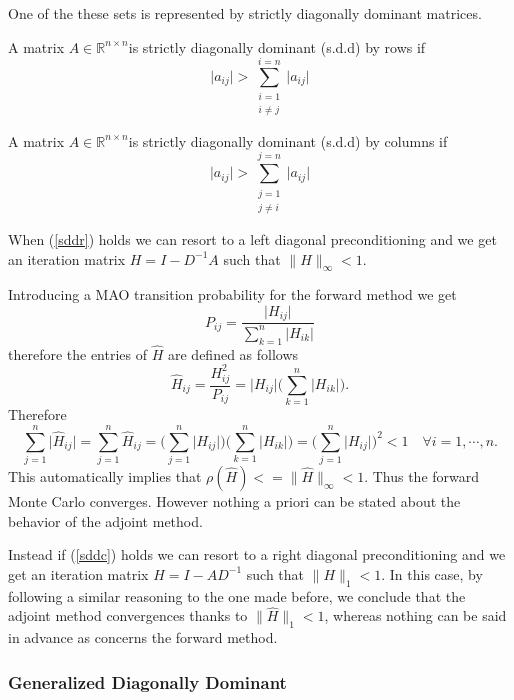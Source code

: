 One of the these sets is represented by strictly diagonally dominant matrices.

\begin{defn}
 A matrix $A\in\mathbb{R}^{n\times n}$is strictly diagonally dominant (s.d.d)
by rows if
 \begin{equation}
    \lvert a_{ij}\rvert>\sum_{\substack{i=1\\ i\ne j}}^{i=n}\lvert
a_{ij}\rvert
\label{sddr}
 \end{equation}
\end{defn}

\begin{defn}
 A matrix $A\in\mathbb{R}^{n\times n}$is strictly diagonally dominant (s.d.d)
by columns if
 \begin{equation}
    \lvert a_{ij}\rvert>\sum_{\substack{j=1\\ j\ne i}}^{j=n}\lvert
a_{ij}\rvert
\label{sddc}
 \end{equation}
\end{defn}

When (\ref{sddr}) holds we can resort to a left diagonal preconditioning and we
get an iteration matrix $H=I-D^{-1}A$ such that $\lVert H \rVert_{\infty}<1$.

Introducing a MAO transition probability for the forward method we get
\[
 P_{ij}=\frac{\lvert H_{ij}\rvert}{\sum_{k=1}^n\lvert H_{ik}\rvert}
\]
therefore the entries of $\hat{H}$ are defined as follows
\[
 \hat{H}_{ij}=\frac{H^2_{ij}}{P_{ij}}=\lvert H_{ij}\rvert\bigg
(\sum_{k=1}^n\lvert
H_{ik}\rvert\bigg ).
\]
Therefore
\[
 \sum_{j=1}^n\lvert \hat{H}_{ij} \rvert = \sum_{j=1}^n \hat{H}_{ij} =\bigg
(\sum_{j=1}^n \lvert H_{ij}\rvert\bigg )\bigg (\sum_{k=1}^n\lvert
H_{ik}\rvert\bigg ) =\bigg
(\sum_{j=1}^n \lvert H_{ij}\rvert\bigg ) ^2 <1 \quad \forall i=1,\cdots, n.
\]
This automatically implies that $\rho(\hat{H})<=\lVert
\hat{H}\rVert_{\infty}<1$. Thus the forward Monte Carlo converges.
However nothing a priori can be
stated about the behavior of the adjoint method.

Instead if (\ref{sddc}) holds we can resort to a right diagonal preconditioning
and we
get an iteration matrix $H=I-AD^{-1}$ such that $\lVert H \rVert_{1}<1$.
In this case, by following a similar reasoning to the one made before, we
conclude that the adjoint method convergences thanks to $\lVert
\hat{H}\rVert_1<1$,
whereas nothing can be said in advance as concerns the forward method.

\subsubsection{Generalized Diagonally Dominant}
\label{sec:gdd}

